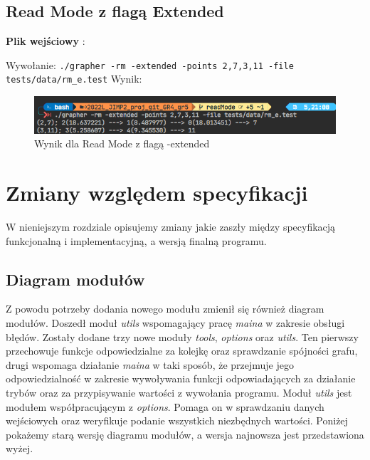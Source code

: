 \documentclass[10pt, a4paper]{report}
\begin{document}
    \subsection{Read Mode z flagą Extended}
    \textbf{Plik wejściowy} :
    
    Wywołanie:
    \newline\newline \texttt{./grapher -rm -extended -points 2,7,3,11 -file tests/data/rm\_e.test}
    \newline\newline Wynik:
    \begin{figure}[ht]
        \begin{center}
            \includegraphics[scale=0.8]{rm_e.png}
            \caption {Wynik dla Read Mode z flagą -extended}
        \end{center}
    \end{figure}

    \section{Zmiany względem specyfikacji}
    W nieniejszym rozdziale opisujemy zmiany jakie zaszły między specyfikacją funkcjonalną i implementacyjną, a wersją finalną programu.

    \subsection{Diagram modułów}
    Z powodu potrzeby dodania nowego modułu zmienił się również diagram modułów.
    Doszedł moduł \textit{utils} wspomagający pracę \textit{maina} w zakresie obsługi błędów. Zostały dodane trzy nowe moduły \textit{tools}, \textit{options} oraz \textit{utils}. Ten pierwszy przechowuje funkcje odpowiedzialne za kolejkę oraz sprawdzanie spójności grafu, drugi
    wspomaga działanie \textit{maina} w taki sposób, że przejmuje jego odpowiedzialność w zakresie wywoływania funkcji odpowiadających za działanie trybów oraz za przypisywanie wartości z wywołania programu. Moduł \textit{utils} jest modułem współpracującym z \textit{options}.
    Pomaga on w sprawdzaniu danych wejściowych oraz weryfikuje podanie wszystkich niezbędnych wartości.
    Poniżej pokażemy starą wersję diagramu modułów, a wersja najnowsza jest przedstawiona wyżej.
\end{document}

